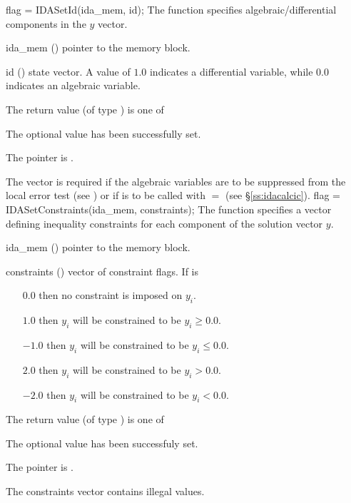 {
flag = IDASetId(ida\_mem, id);
}
{
  The function  specifies algebraic/differential
  components in the $y$ vector.
}
{
  \begin{args}
  \item[ida\_mem] ()
    pointer to the {\ida} memory block.
  \item[id] ()
    state vector. A value of $1.0$ indicates a differential variable, while
    $0.0$ indicates an algebraic variable.
  \end{args}
}
{
  The return value  (of type ) is one of
  \begin{args}
  \item[\Id{IDA\_SUCCESS}] 
    The optional value has been successfully set.
  \item[\Id{IDA\_MEM\_NULL}]
    The  pointer is .
  \end{args}
}
{
  The vector  is required if the algebraic variables are to be 
  suppressed from the local error test (see ) or
  if  is to be called with  $=$ 
  (see \S\ref{ss:idacalcic}).
}
{
flag = IDASetConstraints(ida\_mem, constraints);
}
{
  The function  specifies a vector defining
  inequality constraints for each component of the solution vector $y$.
}
{
  \begin{args}
  \item[ida\_mem] ()
    pointer to the {\ida} memory block.
  \item[constraints] ()
    vector of constraint flags. If  is
    \begin{itemize}    
    \item[$0.0$] then no constraint is imposed on $y_i$. 
    \item[$1.0$] then $y_i$ will be constrained to be $y_i \ge 0.0$.
    \item[$-1.0$] then $y_i$ will be constrained to be $y_i \le 0.0$.
    \item[$2.0$] then $y_i$ will be constrained to be $y_i > 0.0$.
    \item[$-2.0$] then $y_i$ will be constrained to be $y_i < 0.0$.
    \end{itemize}
  \end{args}
}
{
  The return value  (of type ) is one of
  \begin{args}
  \item[\Id{IDA\_SUCCESS}] 
    The optional value has been successfuly set.
  \item[\Id{IDA\_MEM\_NULL}]
    The  pointer is .
  \item[\Id{IDA\_ILL\_INPUT}]
    The constraints vector contains illegal values.
  \end{args}
}
